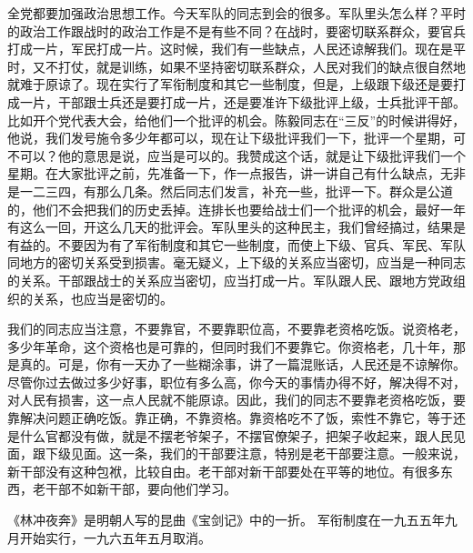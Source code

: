 全党都要加强政治思想工作。今天军队的同志到会的很多。军队里头怎么样？平时的政治工作跟战时的政治工作是不是有些不同？在战时，要密切联系群众，要官兵打成一片，军民打成一片。这时候，我们有一些缺点，人民还谅解我们。现在是平时，又不打仗，就是训练，如果不坚持密切联系群众，人民对我们的缺点很自然地就难于原谅了。现在实行了军衔制度和其它一些制度，但是，上级跟下级还是要打成一片，干部跟士兵还是要打成一片，还是要准许下级批评上级，士兵批评干部。比如开个党代表大会，给他们一个批评的机会。陈毅同志在“三反”的时候讲得好，他说，我们发号施令多少年都可以，现在让下级批评我们一下，批评一个星期，可不可以？他的意思是说，应当是可以的。我赞成这个话，就是让下级批评我们一个星期。在大家批评之前，先准备一下，作一点报告，讲一讲自己有什么缺点，无非是一二三四，有那么几条。然后同志们发言，补充一些，批评一下。群众是公道的，他们不会把我们的历史丢掉。连排长也要给战士们一个批评的机会，最好一年有这么一回，开这么几天的批评会。军队里头的这种民主，我们曾经搞过，结果是有益的。不要因为有了军衔制度和其它一些制度，而使上下级、官兵、军民、军队同地方的密切关系受到损害。毫无疑义，上下级的关系应当密切，应当是一种同志的关系。干部跟战士的关系应当密切，应当打成一片。军队跟人民、跟地方党政组织的关系，也应当是密切的。

我们的同志应当注意，不要靠官，不要靠职位高，不要靠老资格吃饭。说资格老，多少年革命，这个资格也是可靠的，但同时我们不要靠它。你资格老，几十年，那是真的。可是，你有一天办了一些糊涂事，讲了一篇混账话，人民还是不谅解你。尽管你过去做过多少好事，职位有多么高，你今天的事情办得不好，解决得不对，对人民有损害，这一点人民就不能原谅。因此，我们的同志不要靠老资格吃饭，要靠解决问题正确吃饭。靠正确，不靠资格。靠资格吃不了饭，索性不靠它，等于还是什么官都没有做，就是不摆老爷架子，不摆官僚架子，把架子收起来，跟人民见面，跟下级见面。这一条，我们的干部要注意，特别是老干部要注意。一般来说，新干部没有这种包袱，比较自由。老干部对新干部要处在平等的地位。有很多东西，老干部不如新干部，要向他们学习。


\begin{maonote}
《林冲夜奔》是明朝人写的昆曲《宝剑记》中的一折。
军衔制度在一九五五年九月开始实行，一九六五年五月取消。
\end{maonote}

